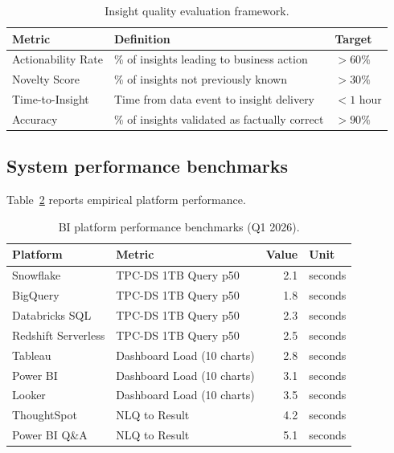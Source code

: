 \documentclass[preprint,12pt,authoryear]{elsarticle}
\theoremstyle{definition}
\begin{document}
\begin{table}[ht]
\centering
\caption{Insight quality evaluation framework.}
\label{tab:insight-quality}
\begin{tabular}{lll}
\toprule
\textbf{Metric} & \textbf{Definition} & \textbf{Target} \\
\midrule
Actionability Rate & \% of insights leading to business action  & $>60\%$ \\
Novelty Score      & \% of insights not previously known         & $>30\%$ \\
Time-to-Insight    & Time from data event to insight delivery    & $<1$ hour \\
Accuracy           & \% of insights validated as factually correct & $>90\%$ \\
\bottomrule
\end{tabular}
\end{table}

\subsection{System performance benchmarks}

Table~\ref{tab:bi-perf} reports empirical platform performance.

\begin{table}[ht]
\centering
\caption{BI platform performance benchmarks (Q1 2026).}
\label{tab:bi-perf}
\begin{tabular}{llrl}
\toprule
\textbf{Platform} & \textbf{Metric} & \textbf{Value} & \textbf{Unit} \\
\midrule
Snowflake          & TPC-DS 1TB Query p50    & 2.1 & seconds \\
BigQuery           & TPC-DS 1TB Query p50    & 1.8 & seconds \\
Databricks SQL     & TPC-DS 1TB Query p50    & 2.3 & seconds \\
Redshift Serverless & TPC-DS 1TB Query p50   & 2.5 & seconds \\
\midrule
Tableau            & Dashboard Load (10 charts) & 2.8 & seconds \\
Power BI           & Dashboard Load (10 charts) & 3.1 & seconds \\
Looker             & Dashboard Load (10 charts) & 3.5 & seconds \\
\midrule
ThoughtSpot        & NLQ to Result           & 4.2 & seconds \\
Power BI Q\&A      & NLQ to Result           & 5.1 & seconds \\
\bottomrule
\end{tabular}
\end{table}
\end{document}
